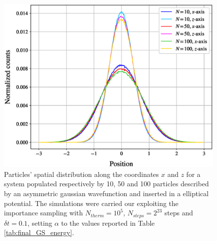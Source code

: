 {\begin{figure}[h!]
    \includegraphics[scale=0.37]{images/spatial_distribution_x_z.eps}
    \caption{Particles' spatial distribution along the coordinates $x$ and $z$ for a system populated respectively by 10, 50 and 100 particles described by an asymmetric gaussian wavefunction and inserted in a elliptical potential. The simulations were carried our exploiting the importance sampling with $N_{therm}=10^5$, $N_{steps}=2^{23}$ steps and $\delta t =0.1$, setting $\alpha$ to the values reported in Table \ref{tab:final_GS_energy}. }
    \label{fig:spatial_distribution_x_z}
\end{figure}}